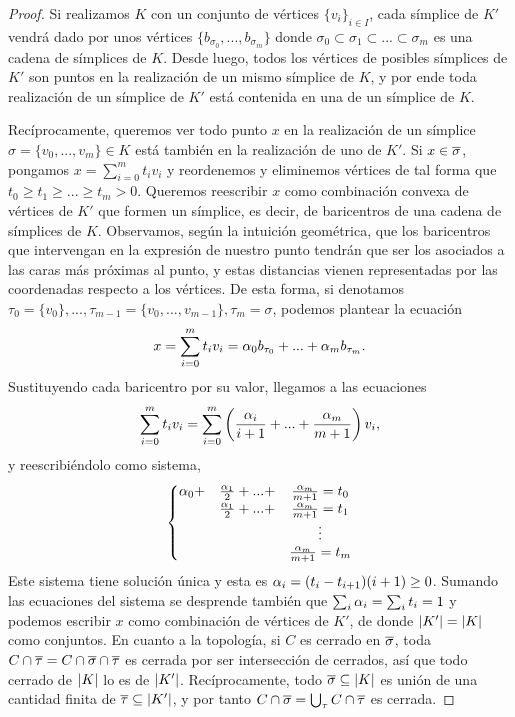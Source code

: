 \begin{proof}
  Si realizamos $ K  $ con un conjunto de vértices $ \{v_i\}_{i\in I}  $, cada símplice de $ K'  $ vendrá dado por unos  vértices $ \{b_{\sigma_0 },...,b_{\sigma_m }\} $ donde $ \sigma_0\subset \sigma_1\subset...\subset \sigma_m  $ es una cadena de símplices de $ K  $. Desde luego, todos los vértices de posibles símplices de $ K'  $ son puntos en la realización de un mismo símplice de $ K  $, y por ende toda realización de un símplice de $ K'  $ está contenida en una de un símplice  de $K  $. 
  
  Recíprocamente, queremos ver todo punto $x$ en la realización de un símplice $ \sigma = \{v_0,...,v_m \}\in K  $ está también en la realización de uno de $K'$. Si $ x\in \overline{\sigma } $, pongamos $ x = \sum_{i=0}^m t_iv_i $ y reordenemos y eliminemos vértices de tal forma que  $ t_0\geq t_1\geq...\geq t_m >0 $.  Queremos reescribir $ x  $ como combinación convexa de vértices de $K'$ que formen un símplice, es decir, de baricentros de una cadena de símplices de $K$. Observamos, según la intuición geométrica, que los baricentros que intervengan en la expresión de nuestro punto tendrán que ser los asociados a las caras más próximas al punto, y estas distancias vienen representadas por las coordenadas respecto a los vértices. De esta forma, si denotamos $ \tau_0 = \{v_0\},...,\tau_{m-1} = \{v_0,...,v_{m-1}\},\tau_m = \sigma  $, podemos plantear la ecuación 
  \begin{gather*}
    x = \sum_{i=0}^m t_i v_i = \alpha_0 b_{\tau_0}+...+\alpha_m b_{\tau_m}.
  \end{gather*}
  Sustituyendo cada baricentro por su valor, llegamos a las ecuaciones 
  \begin{gather*}
    \sum_{i=0}^m t_iv_{i} = \sum_{i=0}^m \left(\frac{\alpha_i }{i+1}+...+\frac{\alpha_m}{m+1}\right)v_i,
  \end{gather*}
  y reescribiéndolo como sistema, 
  \begin{gather*}
    \left\{ \begin{matrix}
        \alpha_0 + & \frac{\alpha_1 }{2} +...+&\frac{\alpha_m }{m+1} = t_0\\ 
      & \frac{\alpha_1 }{2} +...+&\frac{\alpha_m }{m+1} = t_1 \\ 
      &&\vdots \\ 
      & & \frac{\alpha_m }{m+1} = t_m
    \end{matrix}\right.
  \end{gather*}
  Este sistema tiene solución única y esta es $\alpha_i = (t_{i}-t_{i+1})(i+1) \geq 0$. Sumando las ecuaciones del sistema se desprende también que $\sum_i \alpha_i = \sum_i t_i =1 $ y podemos escribir $ x  $ como combinación de vértices de $ K'  $, de donde $ \abs{K' } = \abs{K } $ como conjuntos. En cuanto a la topología, si $ C$ es cerrado en $ \overline{\sigma } $, toda $ C\cap \overline{\tau } = C\cap \overline{\sigma }\cap \overline{\tau }$ es cerrada por ser intersección de cerrados, así que todo cerrado de $ \abs{K}  $ lo es de $ \abs{K' } $. Recíprocamente, todo $ \overline{\sigma } \subseteq \abs{K} $ es unión de una cantidad finita de $ \overline{\tau }\subseteq \abs{K' } $, y por tanto $ C\cap \overline{\sigma} = \bigcup_\tau C\cap\overline{\tau } $ es cerrada.
\end{proof}
